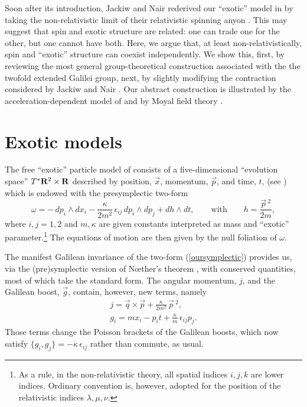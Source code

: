 \documentclass[a4paper,11pt]{article}
\let\ssection=\section
\renewcommand{\section}{\setcounter{equation}{0}\ssection}
\newcommand{\bR}{{\bf R}}
\newcommand{\vx}{{\vec x}}
\def\vg{{\vec k}}
\def\vp{{\vec p}}
\def\vq{{\vec q}}
\def\vg{{\vec g}}
\def\vx{{\vec x}}
\begin{document}
  Soon after its introduction, Jackiw and Nair \cite{JaNa2} rederived
our ``exotic'' model in \cite{DH} by taking the non-relativistic limit
of their  relativistic spinning anyon \cite{JaNa}.
This may suggest that spin and exotic structure are related:
  one can trade one for the other, but one cannot
have both. Here, we argue that, at least  non-relativistically,
spin and ``exotic'' structure can coexist independently.
We show this, first, by reviewing the most general group-theoretical
construction associated with the the twofold extended Galilei group,
next, by slightly modifying the contraction considered by Jackiw and Nair
\cite{JaNa2}. Our abstract construction is
illustrated by the acceleration-dependent model of
\cite{LSZ} and by Moyal field theory \cite{MoyalFT, HoMa}.

\goodbreak


\section{Exotic models}

The free ``exotic'' particle model of \cite{DH} consists of a
five-dimensional ``evolution space'' $T^*\bR^2\times\bR$
described by position, $\vx$, momentum,
$\vp$, and time, $t$, (see \cite{SSD}) which is endowed with the presymplectic
two-form
\begin{equation}
\omega
=
-\,dp_i\wedge dx_i
-
\displaystyle\frac{\kappa}{2m^2}\,\epsilon_{ij}\,dp_i\wedge{}dp_j
+dh\wedge dt,
\qquad
\mathrm{with}
\qquad
h=\displaystyle\frac{\vp{\,}^2}{2m},
\label{oursymplectic}
\end{equation}
where $i,j=1,2$ and $m,\kappa$ are given constants interpreted as mass and
``exotic'' parameter.\footnote{As a rule, in the non-relativistic
theory, all spatial indices $i,j,k$ are lower indices.  Ordinary convention is,
however, adopted for the position of the relativistic
indices $\lambda,\mu,\nu$.}
The equations of motion are then given by the null foliation of $\omega$.

The manifest Galilean invariance of the two-form (\ref{oursymplectic})
provides us, via the (pre)\-symplectic version of N{\oe}ther's theorem
\cite{SSD}, with conserved quantities, most of which take the standard form.
The angular momentum, $j$, and the Galilean boost,
$\vg$, contain, however, new terms, namely
\begin{equation}
\begin{array}{ll}
j=\vq\times\vp+\displaystyle\frac{\kappa}{2m^2}\,\vp{\,}^2,
\\[8pt]
g_i=mx_i-p_it+\displaystyle\frac{\kappa}{m}\,\epsilon_{ij}p_j.
\end{array}
\label{ourconserved}
\end{equation}
Those terms change the Poisson brackets of the Galilean boosts, which now
satisfy
$
\{g_i, g_j\}=-\kappa\,\epsilon_{ij}
$
rather than commute, as usual.
\end{document}
